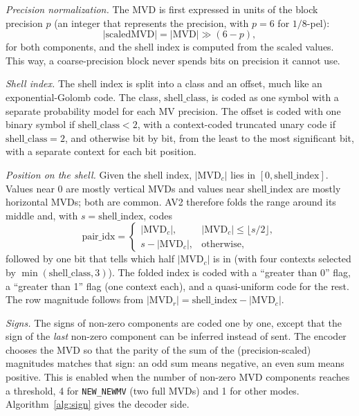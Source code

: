 \documentclass[journal]{IEEEtran}
\newcommand{\code}[1]{\texttt{#1}}
\newcommand{\mvd}{\mathrm{MVD}}
\begin{document}
\emph{Precision normalization.} The MVD is first expressed in units of the
block precision $p$ (an integer that represents the precision, with
$p=6$ for $1/8$-pel):
\begin{equation}
  |\mathrm{scaledMVD}| = |\mvd| \gg (6 - p),
\end{equation}
for both components, and the shell index is computed from the scaled values.
This way, a coarse-precision block never spends bits on precision it cannot
use.

\emph{Shell index.} The shell index is split into a class and an offset, much
like an exponential-Golomb code. The class, $\mathrm{shell\_class}$, is coded
as one symbol with a separate probability model for each MV precision. The
offset is coded with one binary symbol if $\mathrm{shell\_class}<2$, with a
context-coded truncated unary code if $\mathrm{shell\_class}=2$, and otherwise
bit by bit, from the least to the most significant bit, with a separate
context for each bit position.

\emph{Position on the shell.} Given the shell index, $|\mvd_c|$ lies in
$[0,\mathrm{shell\_index}]$. Values near 0 are mostly vertical MVDs and values
near $\mathrm{shell\_index}$ are mostly horizontal MVDs; both are common.
AV2 therefore folds the range around its middle and, with
$s = \mathrm{shell\_index}$, codes
\begin{equation}
  \mathrm{pair\_idx} =
  \begin{cases}
    |\mvd_c|, & |\mvd_c| \le \lfloor s/2 \rfloor,\\
    s - |\mvd_c|, & \text{otherwise},
  \end{cases}
\end{equation}
followed by one bit that tells which half $|\mvd_c|$ is in (with four
contexts selected by $\min(\mathrm{shell\_class},3)$). The folded index is coded
with a ``greater than 0'' flag, a ``greater than 1'' flag (one context each),
and a quasi-uniform code for the rest. The row magnitude follows from
$|\mvd_r| = \mathrm{shell\_index} - |\mvd_c|$.

\emph{Signs.} The signs of non-zero components are coded one by one, except
that the sign of the \emph{last} non-zero component can be inferred instead
of sent. The encoder chooses the MVD so that the parity of the sum of the
(precision-scaled) magnitudes matches that sign: an odd sum means negative,
an even sum means positive. This is enabled when the number of non-zero MVD
components reaches a threshold, 4 for \code{NEW\_NEWMV} (two full MVDs) and 1
for other modes. Algorithm~\ref{alg:sign} gives the decoder side.
\end{document}
